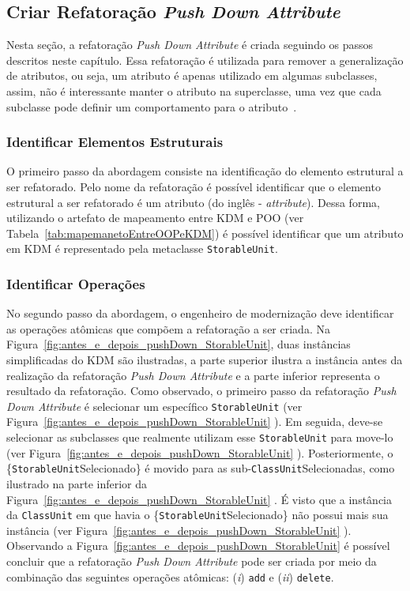 
		
\subsection{Criar Refatoração \textit{Push Down Attribute}}
Nesta seção, a refatoração \textit{Push Down Attribute} é criada seguindo os passos descritos neste capítulo. Essa refatoração é utilizada para remover a generalização de atributos, ou seja, um atributo é apenas utilizado em algumas subclasses, assim, não é interessante manter o atributo na superclasse, uma vez que cada subclasse pode definir um comportamento para o atributo~\cite{Fowler1999}.


\subsubsection{Identificar Elementos Estruturais}
O primeiro passo da abordagem consiste na identificação do elemento estrutural a ser refatorado. Pelo nome da refatoração é possível identificar que o elemento estrutural a ser refatorado é um atributo (do inglês - \textit{attribute}). Dessa forma, utilizando o artefato de mapeamento entre KDM e POO (ver Tabela~\ref{tab:mapemanetoEntreOOPeKDM}) é possível identificar que um atributo em KDM é representado pela metaclasse \texttt{StorableUnit}.

\subsubsection{Identificar Operações}
No segundo passo da abordagem, o engenheiro de modernização deve identificar as operações atômicas que compõem a refatoração a ser criada. Na Figura~\ref{fig:antes_e_depois_pushDown_StorableUnit}, duas instâncias simplificadas do KDM são ilustradas, a parte superior ilustra a instância antes da realização da refatoração \textit{Push Down Attribute} e a parte inferior representa o resultado da refatoração. Como observado, o primeiro passo da refatoração \textit{Push Down Attribute} é selecionar um específico \texttt{StorableUnit} (ver Figura~\ref{fig:antes_e_depois_pushDown_StorableUnit} ). Em seguida, deve-se selecionar as subclasses que realmente utilizam esse \texttt{StorableUnit} para move-lo (ver Figura~\ref{fig:antes_e_depois_pushDown_StorableUnit} ). Posteriormente, o \{\texttt{StorableUnit}Selecionado\} é movido para as sub-\texttt{ClassUnit}Selecionadas, como ilustrado na parte inferior da Figura~\ref{fig:antes_e_depois_pushDown_StorableUnit} . É visto que a instância da \texttt{ClassUnit} em que havia o \{\texttt{StorableUnit}Selecionado\} não possui mais sua instância (ver Figura~\ref{fig:antes_e_depois_pushDown_StorableUnit} ). Observando a Figura~\ref{fig:antes_e_depois_pushDown_StorableUnit} é possível concluir que a refatoração \textit{Push Down Attribute} pode ser criada por meio da combinação das seguintes operações atômicas: (\textit{i}) \texttt{add} e (\textit{ii}) \texttt{delete}. 


